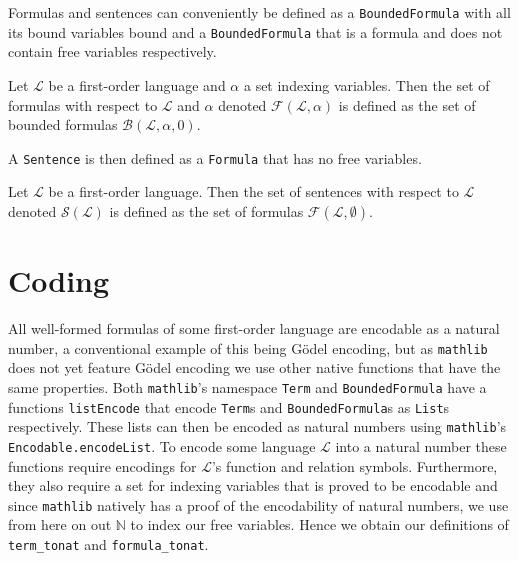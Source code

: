 Formulas and sentences can conveniently be defined as a \texttt{BoundedFormula} with all its bound variables bound and a \texttt{BoundedFormula} that is a formula and does not contain free variables respectively.

\begin{definition}\label{def:FO-Formula}
  \leanok
    Let $\mathcal{L}$ be a first-order language and $\alpha$ a set indexing variables. Then the set of formulas with respect to $\mathcal{L}$ and $\alpha$ denoted $\mathcal{F}(\mathcal{L},\alpha)$ is defined as the set of bounded formulas $\mathcal{B}(\mathcal{L},\alpha,0)$.
\end{definition}

A \texttt{Sentence} is then defined as a \texttt{Formula} that has no free variables.

\begin{definition}\label{def:FO-Sentence}
  \leanok
    Let $\mathcal{L}$ be a first-order language. Then the set of sentences with respect to $\mathcal{L}$ denoted $\mathcal{S}(\mathcal{L})$ is defined as the set of formulas $\mathcal{F}(\mathcal{L},\emptyset)$.
\end{definition}

\section{Coding}\label{subsec:coding}
All well-formed formulas of some first-order language are encodable as a natural number, a conventional example of this being Gödel encoding, but as \texttt{mathlib} does not yet feature Gödel encoding we use other native functions that have the same properties. Both \texttt{mathlib}'s namespace \texttt{Term} and \texttt{BoundedFormula} have a functions \texttt{listEncode} that encode \texttt{Term}s and \texttt{BoundedFormula}s as \texttt{List}s respectively. These lists can then be encoded as natural numbers using \texttt{mathlib}'s \texttt{Encodable.encodeList}. To encode some language $\mathcal{L}$ into a natural number these functions require encodings for $\mathcal{L}$'s function and relation symbols. Furthermore, they also require a set for indexing variables that is proved to be encodable and since \texttt{mathlib} natively has a proof of the encodability of natural numbers, we use from here on out $\mathbb{N}$ to index our free variables. Hence we obtain our definitions of \texttt{term\_tonat} and \texttt{formula\_tonat}.

